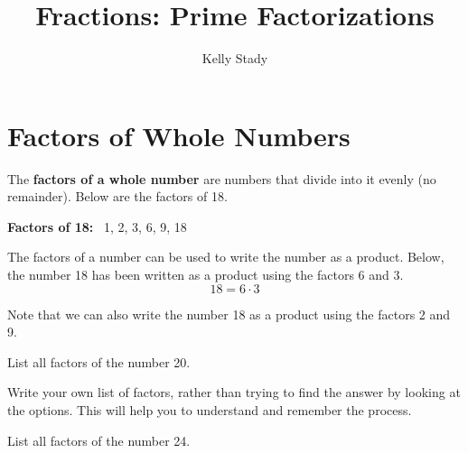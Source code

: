 \documentclass{ximera}[font=12pt]  %
\title{Fractions: Prime Factorizations}   %
\author{Kelly Stady}
\begin{document}
\begin{abstract}

\end{abstract}

\maketitle

\label{xim:FracsPrimeFact}



\section*{Factors of Whole Numbers}

The \textbf{factors of a whole number} are numbers that divide into it evenly (no remainder).  Below are the factors of 18.

\begin{center}
    \textbf{Factors of 18:} \ 1, 2, 3, 6, 9, 18
\end{center}

The factors of a number can be used to write the number as a product.  Below, the number 18 has been written as a product using the factors 6 and 3.
\[ 18 =  6 \cdot 3 \]

Note that we can also write the number 18 as a product using the factors 2 and 9.

\begin{problem}
List all factors of the number 20.

\begin{multipleChoice}
\end{multipleChoice}

\begin{hint}
Write your own list of factors, rather than trying to find the answer by looking at the options.  This will help you to understand and 
remember the process. 
\end{hint}

\end{problem}

\begin{problem}
List all factors of the number 24.
\begin{multipleChoice}
\end{multipleChoice}
\end{problem}
\end{document}
